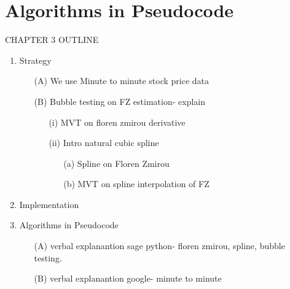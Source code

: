 \section{Algorithms in Pseudocode}
CHAPTER 3 OUTLINE\\
\begin{enumerate}
	\item Strategy
		\begin{itemize}
	  		\item[(A)] We use Minute to minute stock price data
	  		\item[(B)] Bubble testing on FZ estimation- explain
	  		\begin{itemize}
	    		\item[(i)] MVT on floren zmirou derivative\cite{RPPA,FZOETD}
	    		\item[(ii)] Intro natural cubic spline \cite{BMA}
	    		\begin{itemize}
	    		    \item[(a)] Spline on Floren Zmirou
	    			\item[(b)] MVT on spline interpolation of FZ \cite{RPPA,BMA}
	    		\end{itemize}
	  		\end{itemize}
  		\end{itemize}
	\item Implementation
	\item Algorithms in Pseudocode
	\begin{itemize}
		  \item[(A)] verbal explanantion sage python- floren zmirou, spline, bubble testing.
		  \item[(B)] verbal explanantion google- minute to minute
	\end{itemize}
\end{enumerate}
